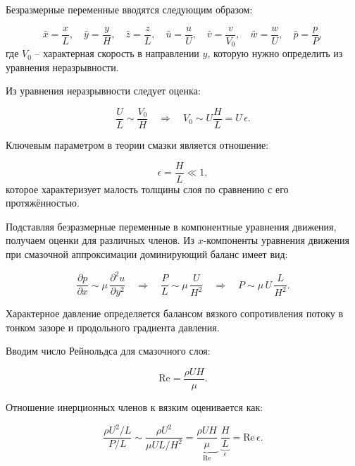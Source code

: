 Безразмерные переменные вводятся следующим образом:

\begin{equation}
\bar{x} = \frac{x}{L}, \quad \bar{y} = \frac{y}{H}, \quad \bar{z} = \frac{z}{L}, \quad \bar{u} = \frac{u}{U}, \quad \bar{v} = \frac{v}{V_0}, \quad \bar{w} = \frac{w}{U}, \quad \bar{p} = \frac{p}{P},
\end{equation}
где $V_0$ -- характерная скорость в направлении $y$, которую нужно определить из уравнения неразрывности.

Из уравнения неразрывности следует оценка:

\begin{equation}
\frac{U}{L} \sim \frac{V_0}{H} \quad \Rightarrow \quad V_0 \sim U\frac{H}{L} = U\,\epsilon.
\end{equation}

Ключевым параметром в теории смазки является отношение:

\begin{equation}
\epsilon = \frac{H}{L} \ll 1,
\label{eq:epsilon}
\end{equation}
которое характеризует малость толщины слоя по сравнению с его протяжённостью.

Подставляя безразмерные переменные в компонентные уравнения движения, получаем оценки для различных членов. Из $x$-компоненты уравнения движения при смазочной аппроксимации доминирующий баланс имеет вид:

\begin{equation}
\frac{\partial p}{\partial x} \sim \mu\,\frac{\partial^2 u}{\partial y^2} \quad \Rightarrow \quad \frac{P}{L} \sim \mu\,\frac{U}{H^2} \quad \Rightarrow \quad P \sim \mu\,U\,\frac{L}{H^2}.
\label{eq:pressure_scale}
\end{equation}

Характерное давление определяется балансом вязкого сопротивления потоку в тонком зазоре и продольного градиента давления.

Вводим число Рейнольдса для смазочного слоя:

\begin{equation}
\mathrm{Re} = \frac{\rho U H}{\mu}.
\end{equation}

Отношение инерционных членов к вязким оценивается как:

\begin{equation}
\frac{\rho U^2/L}{P/L} \sim \frac{\rho U^2}{\mu U L/H^2} = \underbrace{\frac{\rho U H}{\mu}}_{\mathrm{Re}}\;\underbrace{\frac{H}{L}}_{\epsilon} = \mathrm{Re}\,\epsilon.
\label{eq:Re_epsilon}
\end{equation}

